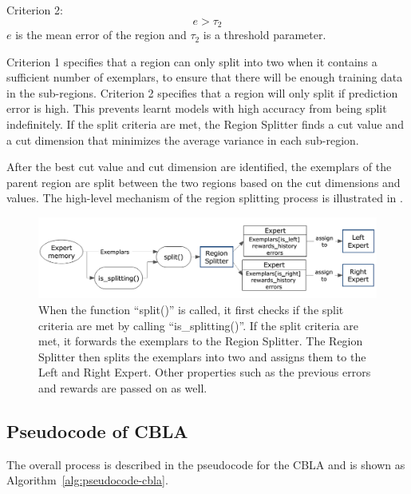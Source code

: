 Criterion 2:	
\begin{equation}\label{eqn:split-criterion2}
	 e>\tau_2
\end{equation}	
$e$ is the mean error of the region and $\tau_2$ is a threshold parameter. 

Criterion 1 specifies that a region can only split into two when it contains a sufficient number of exemplars, to ensure that there will be enough training data in the sub-regions. Criterion 2 specifies that a region will only split if prediction error is high. This prevents learnt models with high accuracy from being split indefinitely. 
If the split criteria are met, the Region Splitter finds a cut value and a cut dimension that minimizes the average variance in each sub-region. 

After the best cut value and cut dimension are identified, the exemplars of the parent region are split between the two regions based on the cut dimensions and values. The high-level mechanism of the region splitting process is illustrated in .

\begin{figure}[!htbp]
	\centering
	\includegraphics[width=1.0 \textwidth]{"fig/cbla/Block Diagram RegionSplitter"}
	\caption[Block diagram of the Region Splitter]{When the function “split()” is called, it first checks if the split criteria are met by calling ``is\_splitting()''. If the split criteria are met, it forwards the exemplars to the Region Splitter. The Region Splitter then splits the exemplars into two and assigns them to the Left and Right Expert. Other properties such as the previous errors and rewards are passed on as well. }
	\label{fig:Block Diagram RegionSplitter}
\end{figure}

\subsection{Pseudocode of CBLA}
	
The overall process is described in the pseudocode for the CBLA and is shown as Algorithm~\ref{alg:pseudocode-cbla}.

